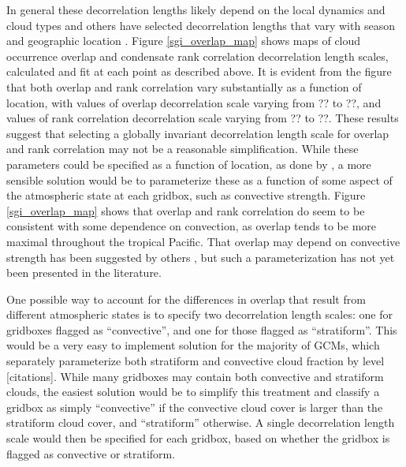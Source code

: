 In general these decorrelation lengths likely depend on the local dynamics and cloud types \citep[e.g.,][]{pincus_et_al_2005} and others have selected decorrelation lengths that vary with season and geographic location \citep[e.g.,][]{raisanen_et_al_2004, oreopoulos_et_al_2012}. Figure \ref{sgi_overlap_map} shows maps of cloud occurrence overlap and condensate rank correlation decorrelation length scales, calculated and fit at each point as described above. It is evident from the figure that both overlap and rank correlation vary substantially as a function of location, with values of overlap decorrelation scale varying from ?? to ??, and values of rank correlation decorrelation scale varying from ?? to ??. These results suggest that selecting a globally invariant decorrelation length scale for overlap and rank correlation may not be a reasonable simplification. While these parameters could be specified as a function of location, as done by \cite{oreopoulos_et_al_2012}, a more sensible solution would be to parameterize these as a function of some aspect of the atmospheric state at each gridbox, such as convective strength. Figure \ref{sgi_overlap_map} shows that overlap and rank correlation do seem to be consistent with some dependence on convection, as overlap tends to be more maximal throughout the tropical Pacific. That overlap may depend on convective strength has been suggested by others \citep{pincus_et_al_2005}, but such a parameterization has not yet been presented in the literature.


One possible way to account for the differences in overlap that result from different atmospheric states is to specify two decorrelation length scales: one for gridboxes flagged as ``convective'', and one for those flagged as ``stratiform''. This would be a very easy to implement solution for the majority of GCMs, which separately parameterize both stratiform and convective cloud fraction by level [citations]. While many gridboxes may contain both convective and stratiform clouds, the easiest solution would be to simplify this treatment and classify a gridbox as simply ``convective'' if the convective cloud cover is larger than the stratiform cloud cover, and ``stratiform'' otherwise. A single decorrelation length scale would then be specified for each gridbox, based on whether the gridbox is flagged as convective or stratiform.

